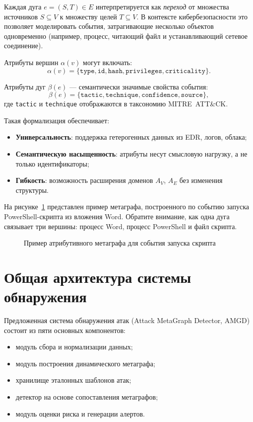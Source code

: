 \documentclass{article}
\begin{document}
Каждая дуга $e = (S, T) \in E$ интерпретируется как \textit{переход} от множества источников $S \subseteq V$ к множеству целей $T \subseteq V$. В контексте кибербезопасности это позволяет моделировать события, затрагивающие несколько объектов одновременно (например, процесс, читающий файл и устанавливающий сетевое соединение).

Атрибуты вершин $\alpha(v)$ могут включать:
\[
\alpha(v) = \{ \texttt{type}, \texttt{id}, \texttt{hash}, \texttt{privileges}, \texttt{criticality} \}.
\]

Атрибуты дуг $\beta(e)$ — семантически значимые свойства события:
\[
\beta(e) = \{ \texttt{tactic}, \texttt{technique}, \texttt{confidence}, \texttt{source} \},
\]
где \texttt{tactic} и \texttt{technique} отображаются в таксономию MITRE~ATT\&CK.

Такая формализация обеспечивает:
\begin{itemize}
    \item \textbf{Универсальность}: поддержка гетерогенных данных из EDR, логов, облака;
    \item \textbf{Семантическую насыщенность}: атрибуты несут смысловую нагрузку, а не только идентификаторы;
    \item \textbf{Гибкость}: возможность расширения доменов $A_V$, $A_E$ без изменения структуры.
\end{itemize}

На рисунке~\ref{fig:metagraph-formal} представлен пример метаграфа, построенного по событию запуска PowerShell-скрипта из вложения Word. Обратите внимание, как одна дуга связывает три вершины: процесс Word, процесс PowerShell и файл скрипта.

    \begin{figure}[ht]
        \centering
            
            \caption{Пример атрибутивного метаграфа для события запуска скрипта}
            \label{fig:metagraph-formal}
    \end{figure}

\section{Общая архитектура системы обнаружения}\label{sec:ch3/sect1}

Предложенная система обнаружения атак (Attack MetaGraph Detector, AMGD) состоит из пяти основных компонентов:

\noindent
\begin{itemize}
    \item модуль сбора и нормализации данных;
    \item модуль построения динамического метаграфа;
    \item хранилище эталонных шаблонов атак;
    \item детектор на основе сопоставления метаграфов;
    \item модуль оценки риска и генерации алертов.
\end{itemize}
\end{document}
